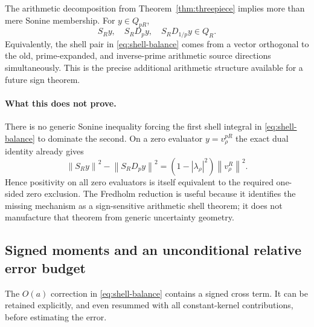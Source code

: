 \documentclass[11pt]{article}
\theoremstyle{remark}
\newcommand{\norm}[1]{\left\lVert #1\right\rVert}
\begin{document}
The arithmetic decomposition from Theorem~\ref{thm:threepiece} implies more than mere Sonine membership. For $y\in Q_{pR}$,
\[
 S_Ry,\quad S_RD_py,\quad S_RD_{1/p}y\in Q_R.
\]
Equivalently, the shell pair in \eqref{eq:shell-balance} comes from a vector orthogonal to the old, prime-expanded, and inverse-prime arithmetic source directions simultaneously. This is the precise additional arithmetic structure available for a future sign theorem.

\paragraph{What this does not prove.}
There is no generic Sonine inequality forcing the first shell integral in \eqref{eq:shell-balance} to dominate the second. On a zero evaluator $y=v_\rho^{pR}$ the exact dual identity already gives
\[
 \norm{S_Ry}^2-\norm{S_RD_py}^2
 =(1-|\lambda_\rho|^2)\norm{v_\rho^R}^2.
\]
Hence positivity on all zero evaluators is itself equivalent to the required one-sided zero exclusion. The Fredholm reduction is useful because it identifies the missing mechanism as a sign-sensitive arithmetic shell theorem; it does not manufacture that theorem from generic uncertainty geometry.


\subsection{Signed moments and an unconditional relative error budget}
The $O(a)$ correction in \eqref{eq:shell-balance} contains a signed
cross term. It can be retained explicitly, and even resummed with all
constant-kernel contributions, before estimating the error.
\end{document}
